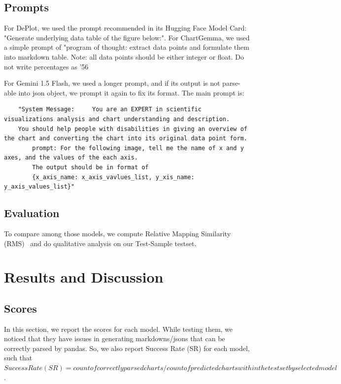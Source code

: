 \documentclass[
	letterpaper, %
]{jdf}
\begin{document}
       \subsection{Prompts}\label{ssect:prompts}
       For DePlot, we used the prompt recommended in its Hugging Face Model Card: "Generate underlying data table of the figure below:".
       For ChartGemma, we used a simple prompt of "program of thought: extract data points and formulate them into markdown table.
    Note: all data points should be either integer or float.
    Do not write percentages as '56%

    For Gemini 1.5 Flash, we used a longer prompt, and if its output is not parse-able into json object, we prompt it again to fix its format.
    The main prompt is: 
\begin{verbatim}
    "System Message:     You are an EXPERT in scientific visualizations analysis and chart understanding and description.
    You should help people with disabilities in giving an overview of the chart and converting the chart into its original data point form.
        prompt: For the following image, tell me the name of x and y axes, and the values of the each axis.
        The output should be in format of 
        {x_axis_name: x_axis_vavlues_list, y_xis_name: y_axis_values_list}"
        \end{verbatim}

\subsection{Evaluation}\label{ssect:method-eval}
To compare among those models, we compute Relative Mapping Similarity (RMS)~\cite{liu2022deplot} and do qualitative analysis on our Test-Sample testset.

\section{Results and Discussion}\label{sect:results}
\subsection{Scores}\label{ssect:rms}
In this section, we report the scores for each model.
While testing them, we noticed that they have issues in generating markdowns/jsons that can be correctly parsed by pandas.
So, we also report Success Rate (SR) for each model, such that $Success Rate (SR) = count of correctly parsed charts/count of predicted charts within the testset by selected model$.
\end{document}
